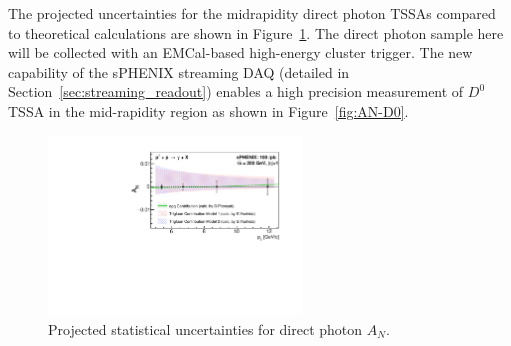 The projected uncertainties for the midrapidity direct photon TSSAs compared to theoretical calculations are shown in Figure~\ref{fig:AN_dp}. The direct photon sample here will be collected with an EMCal-based high-energy cluster trigger. 
The new capability of the sPHENIX streaming DAQ (detailed in
Section~\ref{sec:streaming_readout}) enables a high precision
measurement of $D^0$ TSSA in the mid-rapidity region as shown in
Figure~\ref{fig:AN-D0}.  

\begin{figure}[htbp]
\centering
\includegraphics[width=0.60\textwidth]{figs/AN_dp_sphenix.pdf}
\caption{Projected statistical uncertainties for direct photon $A_N$.}
\label{fig:AN_dp}
\end{figure}

